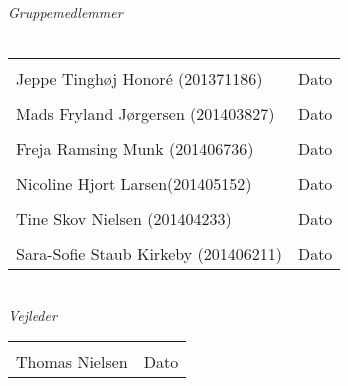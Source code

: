\begin{vplace}[0.6]
{\large \textit{Gruppemedlemmer}}
\\
\\

\noindent \begin{tabular}{ll}
	\makebox[3.0in]{\hrulefill} & \makebox[1.5in]{\hrulefill}\\
	Jeppe Tinghøj Honoré (201371186) & Dato\\[8ex]%
	\makebox[3in]{\hrulefill} & \makebox[1.5in]{\hrulefill}\\
	Mads Fryland J\o rgersen (201403827) & Dato\\[8ex]
	\makebox[3in]{\hrulefill} & \makebox[1.5in]{\hrulefill}\\
	Freja Ramsing Munk (201406736) & Dato\\[8ex]
	\makebox[3in]{\hrulefill} & \makebox[1.5in]{\hrulefill}\\
	Nicoline Hjort Larsen(201405152) & Dato\\[8ex]
	\makebox[3in]{\hrulefill} & \makebox[1.5in]{\hrulefill}\\
	Tine Skov Nielsen (201404233) & Dato\\[8ex]
	\makebox[3in]{\hrulefill} & \makebox[1.5in]{\hrulefill}\\
	Sara-Sofie Staub Kirkeby (201406211) & Dato\\[8ex]
	
\end{tabular}
\\
{\large \textit{Vejleder}}
\\[8ex]
\noindent \begin{tabular}{ll}
	\makebox[3.0in]{\hrulefill} & \makebox[1.5in]{\hrulefill}\\
	Thomas Nielsen & Dato\\[8ex]
\end{tabular}
\end{vplace}
